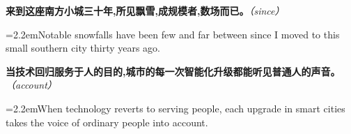 \documentclass[11pt,a4paper]{article}
\newcommand{\num}[1]{\makebox[1.9em][r]{#1.}\hspace{0.3em}}
\newcommand{\prompt}[1]{\emph{\textcolor{tipblue}{\small（#1）}}}
\begin{document}
\begin{minipage}{\linewidth}

\num{44}\textbf{来到这座南方小城三十年,所见飘雪,成规模者,数场而已。}\prompt{since}

\vspace{0.15em}

\noindent\hangindent=2.2em\hspace{2.2em}Notable snowfalls have been few and far between since I moved to this small southern city thirty years ago.

\end{minipage}

\begin{minipage}{\linewidth}

\num{45}\textbf{当技术回归服务于人的目的,城市的每一次智能化升级都能听见普通人的声音。}\prompt{account}

\vspace{0.15em}

\noindent\hangindent=2.2em\hspace{2.2em}When technology reverts to serving people, each upgrade in smart cities takes the voice of ordinary people into account.

\end{minipage}
\end{document}
